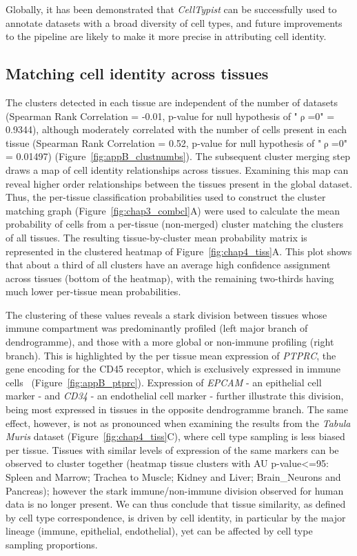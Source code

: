 Globally, it has been demonstrated that \textit{CellTypist} can be successfully used to annotate datasets with a broad diversity of cell types, and future improvements to the pipeline are likely to make it more precise in attributing cell identity. 


\subsection{Matching cell identity across tissues}
\label{section_tissues}
The clusters detected in each tissue are independent of the number of datasets (Spearman Rank Correlation = -0.01, p-value for null hypothesis of "${\uprho}$=0" = 0.9344), although moderately correlated with the number of cells present in each tissue (Spearman Rank Correlation = 0.52, p-value for null hypothesis of "${\uprho}$=0" = 0.01497) (Figure~\ref{fig:appB_clustnumbs}). The subsequent cluster merging step draws a map of cell identity relationships across tissues. Examining this map can reveal higher order relationships between the tissues present in the global dataset. Thus, the per-tissue classification probabilities used to construct the cluster matching graph (Figure~\ref{fig:chap3_combcl}A) were used to calculate the mean probability of cells from a per-tissue (non-merged) cluster matching the clusters of all tissues. The resulting tissue-by-cluster mean probability matrix is represented in the clustered heatmap of Figure~\ref{fig:chap4_tiss}A. This plot shows that about a third of all clusters have an average high confidence assignment across tissues (bottom of the heatmap), with the remaining two-thirds having much lower per-tissue mean probabilities. 

The clustering of these values reveals a stark division between tissues whose immune compartment was predominantly profiled (left major branch of dendrogramme), and those with a more global or non-immune profiling (right branch). This is highlighted by the per tissue mean expression of \textit{PTPRC}, the gene encoding for the CD45 receptor, which is exclusively expressed in immune cells~\citep{altin_role_1997} (Figure~\ref{fig:appB_ptprc}). Expression of \textit{EPCAM} - an epithelial cell marker - and \textit{CD34} - an endothelial cell marker - further illustrate this division, being most expressed in tissues in the opposite dendrogramme branch. The same effect, however, is not as pronounced when examining the results from the \textit{Tabula Muris} dataset (Figure~\ref{fig:chap4_tiss}C), where cell type sampling is less biased per tissue. Tissues with similar levels of expression of the same markers can be observed to cluster together (heatmap tissue clusters with AU p-value<=95: Spleen and Marrow; Trachea to Muscle; Kidney and Liver; Brain\_Neurons and Pancreas); however the stark immune/non-immune division observed for human data is no longer present. We can thus conclude that tissue similarity, as defined by cell type correspondence, is driven by cell identity, in particular by the major lineage (immune, epithelial, endothelial), yet can be affected by cell type sampling proportions.

